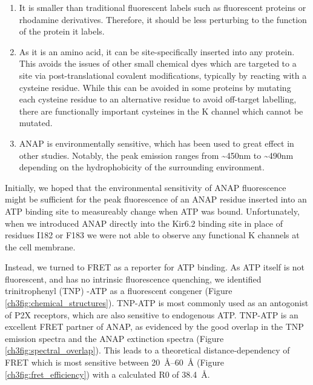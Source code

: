 \begin{enumerate}
	\item It is smaller than traditional fluorescent labels such as fluorescent proteins or rhodamine derivatives.
	Therefore, it should be less perturbing to the function of the protein it labels.
	\item As it is an amino acid, it can be site-specifically inserted into any protein.
	This avoids the issues of other small chemical dyes which are targeted to a site via post-translational covalent modifications, typically by reacting with a cysteine residue.
	While this can be avoided in some proteins by mutating each cysteine residue to an alternative residue to avoid off-target labelling, there are functionally important cysteines in the K\ATP{} channel which cannot be mutated.
	\item ANAP is environmentally sensitive, which has been used to great effect in other studies.
	Notably, the peak emission ranges from \textasciitilde450nm to \textasciitilde490nm depending on the hydrophobicity of the surrounding environment.
\end{enumerate}

Initially, we hoped that the environmental sensitivity of ANAP fluorescence might be sufficient for the peak fluorescence of an ANAP residue inserted into an ATP binding site to measureably change when ATP was bound.
Unfortunately, when we introduced ANAP directly into the Kir6.2 binding site in place of residues I182 or F183 we were not able to observe any functional K\ATP{} channels at the cell membrane.

Instead, we turned to FRET as a reporter for ATP binding.
As ATP itself is not fluorescent, and has no intrinsic fluorescence quenching, we identified trinitrophenyl (TNP) -ATP as a fluorescent congener (Figure \ref{ch3fig:chemical_structures}).
TNP-ATP is most commonly used as an antogonist of P2X receptors, which are also sensitive to endogenous ATP.
TNP-ATP is an excellent FRET partner of ANAP, as evidenced by the good overlap in the TNP emission spectra and the ANAP extinction spectra (Figure \ref{ch3fig:spectral_overlap}).
This leads to a theoretical distance-dependency of FRET which is most sensitive between \SIrange{20}{60}{\angstrom} (Figure \ref{ch3fig:fret_efficiency}) with a calculated R0 of \SI{38.4}{\angstrom}.


